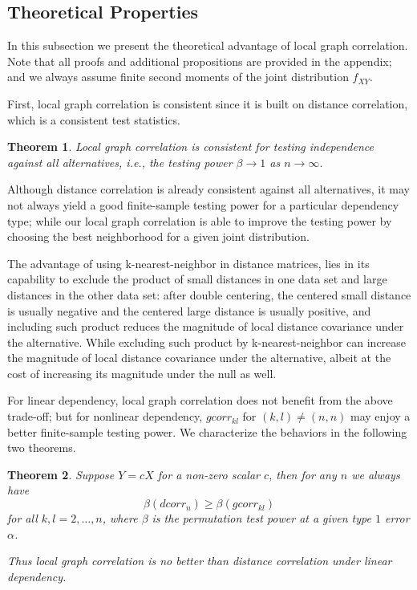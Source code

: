 \documentclass[11pt]{article}
\newtheorem{thm}{Theorem}
\begin{document}
\subsection{Theoretical Properties}
\label{main4}
In this subsection we present the theoretical advantage of local graph correlation. Note that all proofs and additional propositions are provided in the appendix; and we always assume finite second moments of the joint distribution $f_{XY}$.

First, local graph correlation is consistent since it is built on distance correlation, which is a consistent test statistics. 
\begin{thm}
\label{thm1}
Local graph correlation is consistent for testing independence against all alternatives, i.e., the testing power $\beta \rightarrow 1$ as $n \rightarrow \infty$. 
\end{thm}

Although distance correlation is already consistent against all alternatives, it may not always yield a good finite-sample testing power for a particular dependency type; while our local graph correlation is able to improve the testing power by choosing the best neighborhood for a given joint distribution. 

The advantage of using k-nearest-neighbor in distance matrices, lies in its capability to exclude the product of small distances in one data set and large distances in the other data set: after double centering, the centered small distance is usually negative and the centered large distance is usually positive, and including such product reduces the magnitude of local distance covariance under the alternative. While excluding such product by k-nearest-neighbor can increase the magnitude of local distance covariance under the alternative, albeit at the cost of increasing its magnitude under the null as well. 

For linear dependency, local graph correlation does not benefit from the above trade-off; but for nonlinear dependency, $gcorr_{kl}$ for $(k,l) \neq (n,n)$ may enjoy a better finite-sample testing power. We characterize the behaviors in the following two theorems.

\begin{thm}
\label{thm2}
Suppose $Y=cX$ for a non-zero scalar $c$, then for any $n$ we always have
\begin{equation}
\label{equ1}
\beta(dcorr_{n}) \geq \beta(gcorr_{kl})
\end{equation}
for all $k,l=2,\ldots,n$, where $\beta$ is the permutation test power at a given type $1$ error $\alpha$.

Thus local graph correlation is no better than distance correlation under linear dependency.
\end{thm}
\end{document}
